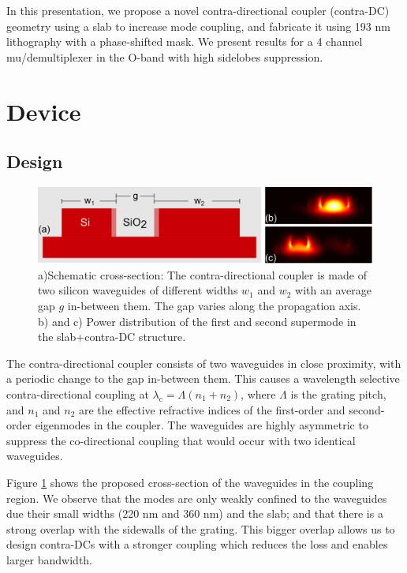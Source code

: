 \documentclass[letterpaper,10pt]{article}
\begin{document}
In this presentation, we propose a novel contra-directional coupler (contra-DC) geometry using a slab to increase mode coupling, and fabricate it using 193 nm lithography with a phase-shifted mask. We present results for a 4 channel mu/demultiplexer in the O-band with high sidelobes suppression.



\section{Device}
\subsection{Design} 
\begin{figure}[htbp]
	\centering
	\includegraphics[width=.99\columnwidth]{CrossSection2}
	\caption{ a)Schematic cross-section: The contra-directional coupler is made of two silicon waveguides of different widths $w_1$ and $w_2$ with an average gap $g$ in-between them. The gap varies along the propagation axis. b) and c) Power distribution of the first and second supermode in the slab+contra-DC structure. }
	\label{fig:Device}
\end{figure}

The contra-directional coupler consists of two waveguides in close proximity, with a periodic change to the gap in-between them. This causes a wavelength selective contra-directional coupling at  $\lambda_\text{c} = \Lambda (n_\text{1}+n_\text{2})$, where $\Lambda$ is the grating pitch, and $n_\text{1}$ and $n_\text{2}$ are the effective refractive indices of the first-order and second-order eigenmodes in the coupler. 
The waveguides are highly asymmetric to suppress the co-directional coupling that would occur with two identical waveguides.

Figure \ref{fig:Device} shows the proposed cross-section of the waveguides in the coupling region. We observe that the modes are only weakly confined to the waveguides due their small widths (220 nm and 360 nm) and the slab; and that there is a strong overlap with the sidewalls of the grating. This bigger overlap allows us to design contra-DCs with a stronger coupling which reduces the loss and enables larger bandwidth.
\end{document}
